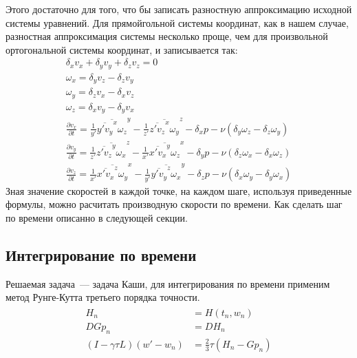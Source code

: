 Этого достаточно для того, что бы записать разностную аппроксимацию исходной системы уравнений. Для прямойгольной системы координат, как в нашем случае, разностная аппроксимация системы несколько проще, чем для произвольной ортогональной системы координат, и записывается так:
\begin{gather}
  \delta_x v_x + \delta_y v_y + \delta_z v_z = 0 
  \\
  \omega_x = \delta_y v_z - \delta_z v_y 
  \\
  \omega_y = \delta_z v_x - \delta_x v_z 
  \\
  \omega_z = \delta_x v_y - \delta_y v_x 
  \\
  \frac{\partial v_x}{\partial t} = \frac{1}{y'}\overline{\overline{y'v_y}^x \omega_z}^y - \frac{1}{z'}\overline{\overline{z'v_z}^x \omega_y}^z - \delta_x p - \nu (\delta_y \omega_z - \delta_z \omega_y)
  \\
  \frac{\partial v_y}{\partial t} = \frac{1}{z'}\overline{\overline{z'v_z}^y \omega_x}^z - \frac{1}{x'}\overline{\overline{x'v_x}^y \omega_z}^x - \delta_y p - \nu (\delta_z \omega_x - \delta_x \omega_z) 
  \\
  \frac{\partial v_z}{\partial t} = \frac{1}{x'}\overline{\overline{x'v_x}^z \omega_y}^x - \frac{1}{y'}\overline{\overline{y'v_y}^z \omega_x}^y - \delta_z p - \nu (\delta_x \omega_y - \delta_y \omega_x)
\end{gather}
Зная значение скоростей в каждой точке, на каждом шаге, используя приведенные формулы, можно расчитать производную скорости по времени. Как сделать шаг по времени описанно в следующей секции. 

\subsection*{Интегрирование по времени}

Решаемая задача~--- задача Каши, для интегрирования по времени применим метод Рунге-Кутта третьего порядка точности.
\begin{gather}
\begin{split}
H_n &= H(t_n, w_n) \\
DGp_n &= DH_n \\
(I - \gamma \tau L)(w' - w_n) &= \frac{2}{3} \tau (H_n - Gp_n) 
\end{split}

\end{gather}


\newpage

